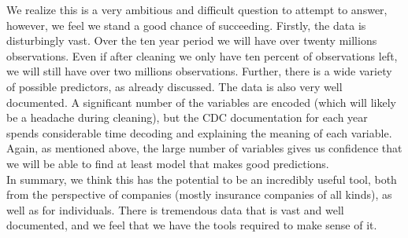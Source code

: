 \documentclass{article}
\begin{document}
We realize this is a very ambitious and difficult question to attempt to answer, however, we feel we stand a good chance of succeeding. Firstly, the data is disturbingly vast. Over the ten year period we will have over twenty millions observations. Even if after cleaning we only have ten percent of observations left, we will still have over two millions observations. Further, there is a wide variety of possible predictors, as already discussed. The data is also very well documented. A significant number of the variables are encoded (which will likely be a headache during cleaning), but the CDC documentation for each year spends considerable time decoding and explaining the meaning of each variable. Again, as mentioned above, the large number of variables gives us confidence that we will be able to find at least model that makes good predictions. \\

In summary, we think this has the potential to be an incredibly useful tool, both from the perspective of companies (mostly insurance companies of all kinds), as well as for individuals. There is tremendous data that is vast and well documented, and we feel that we have the tools required to make sense of it. 
\end{document}
